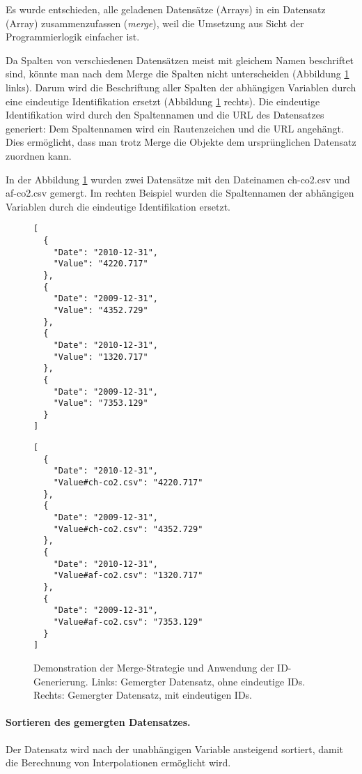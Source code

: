 Es wurde entschieden, alle geladenen Datensätze (Arrays) in ein Datensatz (Array) zusammenzufassen (\textit{merge}), weil die Umsetzung aus Sicht der Programmierlogik einfacher ist. 

Da Spalten von verschiedenen Datensätzen meist mit gleichem Namen beschriftet sind, könnte man nach dem Merge die Spalten nicht unterscheiden (Abbildung \ref{fig:merge} links). Darum wird die Beschriftung aller Spalten der abhängigen Variablen durch eine eindeutige Identifikation ersetzt (Abbildung \ref{fig:merge} rechts). Die eindeutige Identifikation wird durch den Spaltennamen und die URL des Datensatzes generiert: Dem Spaltennamen wird ein Rautenzeichen und die URL angehängt. Dies ermöglicht, dass man trotz Merge die Objekte dem ursprünglichen Datensatz zuordnen kann.

In der Abbildung \ref{fig:merge} wurden zwei Datensätze mit den Dateinamen ch-co2.csv und af-co2.csv gemergt. Im rechten Beispiel wurden die Spaltennamen der abhängigen Variablen durch die eindeutige Identifikation ersetzt.

\begin{figure}[H]
	\centering
	\begin{minipage}{0.40\textwidth}
		\centering
		\begin{verbatim}
[
  {
    "Date": "2010-12-31",
    "Value": "4220.717"
  },
  {
    "Date": "2009-12-31",
    "Value": "4352.729"
  },
  {
    "Date": "2010-12-31",
    "Value": "1320.717"
  },
  {
    "Date": "2009-12-31",
    "Value": "7353.129"
  }
]
		\end{verbatim}
	\end{minipage}\hfill
	\begin{minipage}{0.5\textwidth}
		\centering
		\begin{verbatim}
[
  {
    "Date": "2010-12-31",
    "Value#ch-co2.csv": "4220.717"
  },
  {
    "Date": "2009-12-31",
    "Value#ch-co2.csv": "4352.729"
  },
  {
    "Date": "2010-12-31",
    "Value#af-co2.csv": "1320.717"
  },
  {
    "Date": "2009-12-31",
    "Value#af-co2.csv": "7353.129"
  }
]
		\end{verbatim}
	\end{minipage}
	\caption[Merge-Strategie]{Demonstration der Merge-Strategie und Anwendung der ID-Generierung. Links: Gemergter Datensatz, ohne eindeutige IDs. Rechts: Gemergter Datensatz, mit eindeutigen IDs.}
	\label{fig:merge}
\end{figure}

\paragraph{Sortieren des gemergten Datensatzes.} Der Datensatz wird nach der unabhängigen Variable ansteigend sortiert, damit die Berechnung von Interpolationen ermöglicht wird.

